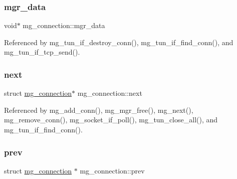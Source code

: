 \mbox{\label{structmg__connection_a19cb5ee4c2402582dcf4cb6a4f899136_a19cb5ee4c2402582dcf4cb6a4f899136}} 
\subsubsection{\texorpdfstring{mgr\+\_\+data}{mgr\_data}}
{\footnotesize\ttfamily void$\ast$ mg\+\_\+connection\+::mgr\+\_\+data}



Referenced by mg\+\_\+tun\+\_\+if\+\_\+destroy\+\_\+conn(), mg\+\_\+tun\+\_\+if\+\_\+find\+\_\+conn(), and mg\+\_\+tun\+\_\+if\+\_\+tcp\+\_\+send().

\mbox{\label{structmg__connection_afcfd89f119a87cba6f6dfec2d2eda5d9_afcfd89f119a87cba6f6dfec2d2eda5d9}} 
\subsubsection{\texorpdfstring{next}{next}}
{\footnotesize\ttfamily struct \hyperlink{structmg__connection}{mg\+\_\+connection}$\ast$ mg\+\_\+connection\+::next}



Referenced by mg\+\_\+add\+\_\+conn(), mg\+\_\+mgr\+\_\+free(), mg\+\_\+next(), mg\+\_\+remove\+\_\+conn(), mg\+\_\+socket\+\_\+if\+\_\+poll(), mg\+\_\+tun\+\_\+close\+\_\+all(), and mg\+\_\+tun\+\_\+if\+\_\+find\+\_\+conn().

\mbox{\label{structmg__connection_aa93fd5ca83f11230bc971a68a7fa8d5e_aa93fd5ca83f11230bc971a68a7fa8d5e}} 
\subsubsection{\texorpdfstring{prev}{prev}}
{\footnotesize\ttfamily struct \hyperlink{structmg__connection}{mg\+\_\+connection} $\ast$ mg\+\_\+connection\+::prev}



